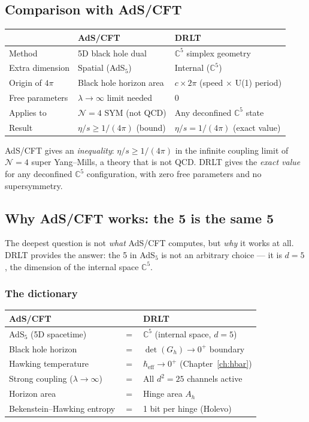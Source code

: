 \documentclass[12pt]{article}
\theoremstyle{remark}
\theoremstyle{definition}
\begin{document}
\subsection{Comparison with AdS/CFT}

\begin{center}
\begin{tabular}{lll}
\hline
& AdS/CFT & DRLT \\
\hline
Method & 5D black hole dual & $\mathbb{C}^5$ simplex geometry \\
Extra dimension & Spatial (AdS$_5$) & Internal ($\mathbb{C}^5$) \\
Origin of $4\pi$ & Black hole horizon area & $c \times 2\pi$ (speed $\times$ U(1) period) \\
Free parameters & $\lambda \to \infty$ limit needed & 0 \\
Applies to & $\mathcal{N}{=}4$ SYM (not QCD) & Any deconfined $\mathbb{C}^5$ state \\
Result & $\eta/s \geq 1/(4\pi)$ (bound) & $\eta/s = 1/(4\pi)$ (exact value) \\
\hline
\end{tabular}
\end{center}

AdS/CFT gives an \emph{inequality}: $\eta/s \geq 1/(4\pi)$ in the infinite coupling limit of $\mathcal{N} = 4$ super Yang--Mills, a theory that is not QCD. DRLT gives the \emph{exact value} for any deconfined $\mathbb{C}^5$ configuration, with zero free parameters and no supersymmetry.

\subsection{Why AdS/CFT works: the 5 is the same 5}

The deepest question is not \emph{what} AdS/CFT computes, but \emph{why} it works at all. DRLT provides the answer: the 5 in AdS$_5$ is not an arbitrary choice --- it is $d = 5$, the dimension of the internal space $\mathbb{C}^5$.

\subsubsection{The dictionary}

\begin{center}
\begin{tabular}{lcl}
\hline
AdS/CFT & & DRLT \\
\hline
AdS$_5$ (5D spacetime) & $=$ & $\mathbb{C}^5$ (internal space, $d = 5$) \\
Black hole horizon & $=$ & $\det(G_h) \to 0^+$ boundary \\
Hawking temperature & $=$ & $\hbar_\text{eff} \to 0^+$ (Chapter~\ref{ch:hbar}) \\
Strong coupling ($\lambda \to \infty$) & $=$ & All $d^2 = 25$ channels active \\
Horizon area & $=$ & Hinge area $A_h$ \\
Bekenstein--Hawking entropy & $=$ & 1 bit per hinge (Holevo) \\
\hline
\end{tabular}
\end{center}
\end{document}
